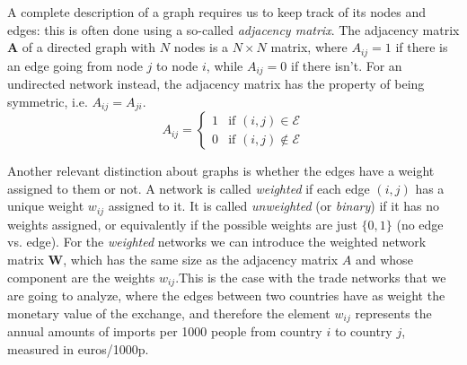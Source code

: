 A complete description of a graph requires us to keep track of its nodes and edges: this is often done using a so-called \textit{adjacency matrix}. The adjacency matrix $\mathbf{A}$ of a directed graph with $N$ nodes is a $N \times N$ matrix, where $A_{ij} = 1$ if there is an edge going from node $j$ to node $i$, while $A_{ij} = 0$ if there isn't. For an undirected network instead, the adjacency matrix has the property of being symmetric, i.e. $A_{ij} = A_{ji}$.
\begin{equation}
    A_{ij} = \begin{cases}
        1 & \text{if } (i,j) \in \mathcal{E} \\
        0 & \text{if } (i,j) \notin \mathcal{E}
    \end{cases}
\end{equation}

Another relevant distinction about graphs is whether the edges have a weight assigned to them or not. A network is called \textit{weighted} if each edge $(i,j)$ has a unique weight $w_{ij}$ assigned to it. It is called \textit{unweighted} (or \textit{binary}) if it has no weights assigned, or equivalently if the possible weights are just $\{0,1\}$ (no edge vs. edge). For the \textit{weighted} networks we can introduce the weighted network matrix $\mathbf{W}$, which has the same size as the adjacency matrix $A$ and whose component are the weights $w_{ij}$.This is the case with the trade networks that we are going to analyze, where the edges between two countries have as weight the monetary value of the exchange, and therefore the element $w_{ij}$ represents the annual amounts of imports per 1000 people from country $i$ to country $j$, measured in euros/1000p.


